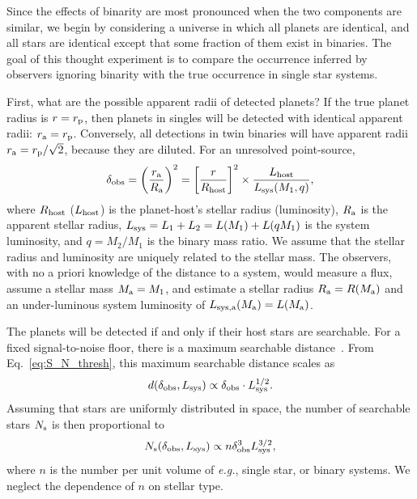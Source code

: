 \documentclass[12pt,modern]{aastex61}
\renewcommand{\a}{_{\rm a}}
\newcommand{\s}{_{\rm s}}
\newcommand{\p}{_{\rm p}}
\begin{document}
Since the effects of binarity are most pronounced when the two components are 
similar, we begin by considering a universe in which all planets are 
identical, and all stars are identical except that some fraction of them exist 
in binaries. The goal of this thought experiment is to compare the occurrence 
inferred by observers ignoring binarity with the true occurrence in single 
star systems.

First, what are the possible apparent radii of detected planets?
If the true planet radius is $r=r\p$, then planets in singles will be 
detected with identical apparent radii: $r\a = r\p$.
Conversely, all detections in twin binaries will have apparent radii 
$r\a=r\p/\sqrt{2}$, because they are diluted.
For an unresolved point-source,
\begin{equation}
\delta_{\rm obs}
= \left(\frac{r\a}{R\a}\right)^2
= \left[{r\over R_{\rm host}}\right]^2\times {L_{\rm host} \over L_{\rm 
        sys}(M_1, q)},
\label{eq:delta_obs_general} 
\end{equation}
where $R_{\rm host}$ ($L_{\rm host}$) is the planet-host's stellar radius 
(luminosity), $R\a$ is the apparent stellar radius, $L_{\rm sys}=L_1+L_2 = 
L(M_1) + L(qM_1)$ is the system luminosity, and $q=M_2/M_1$ is the binary mass 
ratio.
We assume that the stellar radius and luminosity are uniquely related to the 
stellar mass.
The observers, with no a priori knowledge of the distance to a system, would 
measure a flux, assume a stellar mass $M\a=M_1$, and estimate a stellar 
radius $R\a = R(M\a)$ and an under-luminous system luminosity of $L_{\rm 
sys,a}(M\a) = L(M\a)$.

The planets will be detected if and only if their host stars are searchable.
For a fixed signal-to-noise floor, there is a maximum searchable 
distance~\citep{pepper_using_2003,pepper_searching_2005}.
From Eq.~\ref{eq:S_N_thresh}, this maximum searchable distance scales as
\begin{equation}
d(\delta_{\rm obs}, L_{\rm sys}) \propto \delta_{\rm obs} \cdot L_{\rm 
    sys}^{1/2}.
\end{equation}
Assuming that stars are uniformly distributed in space, the number 
of searchable stars $N\s$ is then proportional to
\begin{equation}
N\s(\delta_{\rm obs}, L_{\rm sys}) \propto n \delta_{\rm obs}^3 L_{\rm 
    sys}^{3/2},
\label{eq:N_searchable_prop}
\end{equation}
where $n$ is the number per unit volume of {\it e.g.}, single star, or binary 
systems.
We neglect the dependence of $n$ on stellar type.
\end{document}
